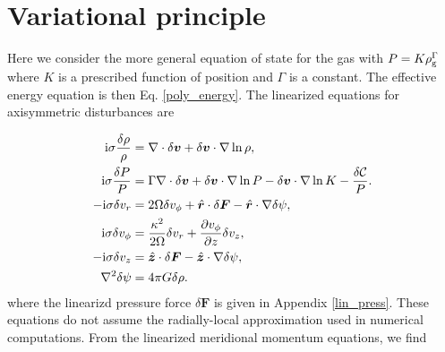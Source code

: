 \section{Variational principle}\label{var_prin}

Here we consider the more general equation of state for the gas with
$P = K \rho_\mathrm{g}^{\Gamma}$ where $K$ is a prescribed function of position
and $\Gamma$ is a constant. The effective energy equation is then
Eq. \ref{poly_energy}. %
The linearized equations for axisymmetric
disturbances are  

\begin{align}
  \mathrm{i}\sigma\frac{\delta\rho}{\rho} &= \nabla\cdot\delta\bm{v} +
  \delta\bm{v}\cdot\nabla\ln{\rho},\label{lin_mass_full}\\
   \mathrm{i}\sigma\frac{\delta P}{P} &= \Gamma \nabla\cdot\delta\bm{v} +
  \delta\bm{v}\cdot\nabla\ln{P} - \delta\bm{v}\cdot\nabla\ln{K} - \frac{\delta\mathcal{C}}{P}.\label{lin_energy_full}\\
  -\mathrm{i}\sigma\delta v_r  &= 2\Omega\delta v_\phi + 
  \hat{\bm{r}} \cdot \delta\bm{F} -  \hat{\bm{r}} \cdot \nabla\delta\psi ,\\
  \mathrm{i}\sigma\delta v_\phi &= \frac{\kappa^2}{2\Omega}\delta v_r + \frac{\partial
    v_\phi}{\partial z}\delta v_z,\\
  -\mathrm{i}\sigma\delta v_z &=  \hat{\bm{z}} \cdot \delta\bm{F}  -  \hat{\bm{z}} \cdot \nabla\delta\psi, \\ 
\nabla^2 \delta\psi & = 4\pi G \delta\rho. 
\end{align}  
where the linearizd pressure force $\delta \bm{F}$ is given in
Appendix \ref{lin_press}. These equations do not assume the
radially-local approximation used in numerical computations. From the
linearized meridional momentum equations, we find  

